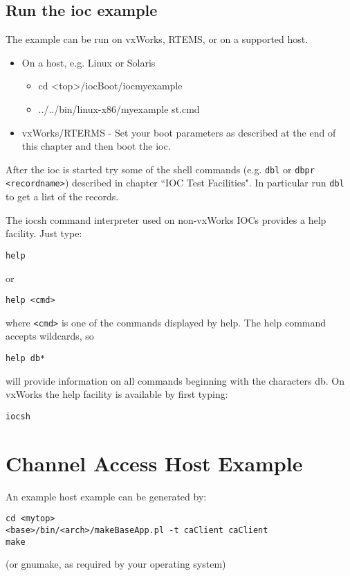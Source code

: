 \subsection{Run the ioc example}

The example can be run on vxWorks, RTEMS, or on a supported host.

\begin{itemize}
\item On a host, e.g. Linux or Solaris

\begin{itemize}
\item cd \textless{}top\textgreater{}/iocBoot/iocmyexample
\item ../../bin/linux-x86/myexample st.cmd
\end{itemize}
\item vxWorks/RTERMS - Set your boot parameters as described at the end of this chapter and then boot the ioc.
\end{itemize}
After the ioc is started try some of the shell commands (e.g. \verb|dbl| or \verb|dbpr <recordname>|) described in chapter ``IOC 
Test Facilities". In particular run \verb|dbl| to get a list of the records.

The iocsh command interpreter used on non-vxWorks IOCs provides a help facility. Just type:

\begin{verbatim}help\end{verbatim}
or
\begin{verbatim}help <cmd>\end{verbatim}
where \verb|<cmd>| is one of the commands displayed by help.  The help command accepts wildcards, so
\begin{verbatim}help db*\end{verbatim}
will provide information on all commands beginning with the characters db.
On vxWorks the help facility is available by first typing:

\begin{verbatim}iocsh\end{verbatim}

\section{Channel Access Host Example}

An example host example can be generated by:

\begin{verbatim}
cd <mytop>
<base>/bin/<arch>/makeBaseApp.pl -t caClient caClient
make
\end{verbatim}
(or gnumake, as required by your operating system)

